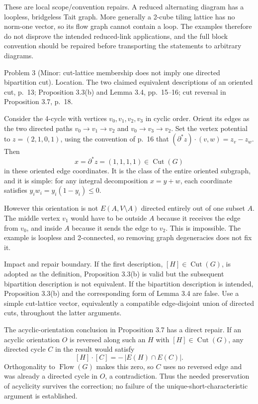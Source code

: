 \documentclass[10pt]{article}
\begin{document}
These are local scope/convention repairs. A reduced alternating diagram has a loopless, bridgeless Tait graph. More generally a 2-cube tiling lattice has no norm-one vector, so its flow graph cannot contain a loop. The examples therefore do not disprove the intended reduced-link applications, and the full block convention should be repaired before transporting the statements to arbitrary diagrams.\par
Problem 3 (Minor: cut-lattice membership does not imply one directed bipartition cut).  Location. The two claimed equivalent descriptions of an oriented cut, p. 13; Proposition 3.3(b) and Lemma 3.4, pp. 15–16; cut reversal in Proposition 3.7, p. 18.\par
Consider the 4-cycle with vertices \(v_0,v_1,v_2,v_3\) in cyclic order. Orient its edges as the two directed paths \(v_0\to v_1\to v_2\) and \(v_0\to v_3\to v_2\). Set the vertex potential to \(z=(2,1,0,1)\), using the convention of p. 16 that \((\partial^*z)\cdot(v,w)=z_v-z_w\). Then \[x=\partial^*z=(1,1,1,1)\in\operatorname{Cut}(G)                 \tag{2.6}\] in these oriented edge coordinates. It is the class of the entire oriented subgraph, and it is simple: for any integral decomposition \(x=y+w\), each coordinate satisfies \(y_iw_i=y_i(1-y_i)\le0\).\par
However this orientation is not \(E(A,V\setminus A)\) directed entirely out of one subset \(A\). The middle vertex \(v_1\) would have to be outside \(A\) because it receives the edge from \(v_0\), and inside \(A\) because it sends the edge to \(v_2\). This is impossible. The example is loopless and 2-connected, so removing graph degeneracies does not fix it.\par
Impact and repair boundary. If the first description, \([H]\in\operatorname{Cut}(G)\), is adopted as the definition, Proposition 3.3(b) is valid but the subsequent bipartition description is not equivalent. If the bipartition description is intended, Proposition 3.3(b) and the corresponding form of Lemma 3.4 are false. Use a simple cut-lattice vector, equivalently a compatible edge-disjoint union of directed cuts, throughout the latter arguments.\par
The acyclic-orientation conclusion in Proposition 3.7 has a direct repair. If an acyclic orientation \(O\) is reversed along such an \(H\) with \([H]\in\operatorname{Cut}(G)\), any directed cycle \(C\) in the result would satisfy \[[H]\cdot[C]=-\,|E(H)\cap E(C)|.\] Orthogonality to \(\operatorname{Flow}(G)\) makes this zero, so \(C\) uses no reversed edge and was already a directed cycle in \(O\), a contradiction. Thus the needed preservation of acyclicity survives the correction; no failure of the unique-short-characteristic argument is established.\par
\end{document}
